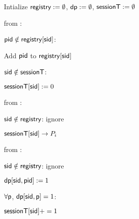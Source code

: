 \begin{bbox}[title={$\globalf{G}_{\msf{clock}}$}]

Intialize ${\mathsf {registry}} := \emptyset$, ${\mathsf {dp}} := \emptyset$, ${\mathsf {sessionT}} := \emptyset$

\OnInput {} from \Partyi:

	\quad \If ${\mathsf {pid}} \notin {\mathsf {registry}}[{\mathsf {sid}}]$:

	\quad \quad Add ${\mathsf {pid}}$ to ${\mathsf {registry}}[{\mathsf {sid}}]$

	\quad \quad \If ${\mathsf {sid}} \notin {\mathsf {sessionT}}$:
		
	\quad \quad \quad ${\mathsf {sessionT}}[{\mathsf {sid}}] := 0$

\OnInput {} from \Partyi:

	\quad \If ${\mathsf {sid}} \notin {\mathsf {registry}}$: ignore

	\quad \Send ${\mathsf {sessionT}}[{\mathsf {sid}}] \rightarrow P_i$ 

\OnInput {} from \Partyi:

	\quad \If ${\mathsf {sid}} \notin {\mathsf {registry}}$: ignore

	\quad ${\mathsf {dp}}[{\mathsf {sid}},{\mathsf {pid}}] := 1$

	\quad \If $\forall {\mathsf {p}}$, ${\mathsf {dp}}[{\mathsf {sid}},{\mathsf {p}}] = 1$:

	\quad \quad ${\mathsf {sessionT}}[{\mathsf {sid}}] += 1$

\end{bbox}
